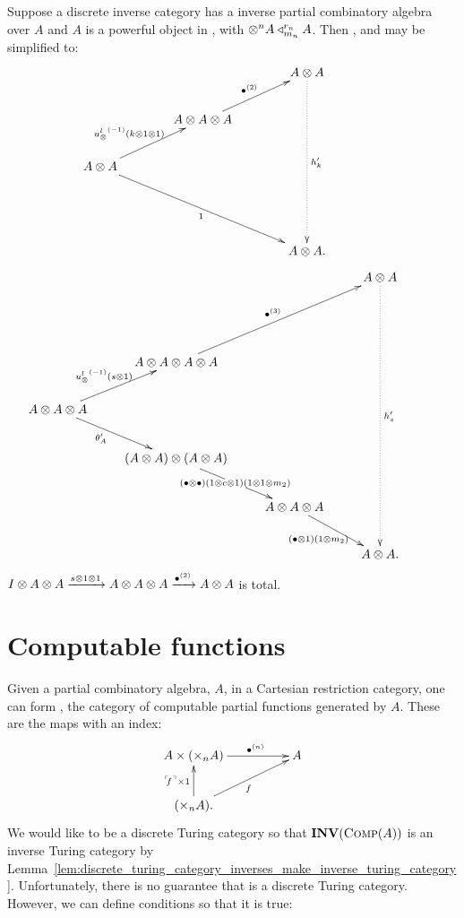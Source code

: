 \begin{lemma}\label{lem:powerful_inverse_partial_combinatory_algebra}
  Suppose a discrete inverse category \X has a inverse partial combinatory algebra over $A$ and $A$
  is  a powerful object in \X, with $\otimes^n A \triangleleft_{m_n}^{r_n} A$. Then ,
   and  may be simplified to:\\
    \[
      \xymatrix@C+15pt{
         && A\*A \ar@{.>}[dddd]^{h'_k}\\
        &A\* A\* A \ar[ur]^{\multibullet{2}} & & \\
        A\* A \ar[ur]^{\inv{\usl}(k\*1\*1)\ \,} \ar[ddrr]_{1} && &\\
         && & \\
        && A\*A. &
      }
    \]
    \[
      \xymatrix{
        &&& A\* A \ar@{.>}[dddddd]^{h'_s} \\
        & &  && \\
        &A\* A\* A\* A
          \ar[uurr]^{\multibullet{3}}\\
        A\* A\* A \ar[ur]^{\inv{\usl}(s\*1)} \ar[dr]_(.4){\theta_A'}\\
        &(A\* A) \* (A\* A) \ar[dr]|{(\bullet\*\bullet)(1\*c\*1)(1\*1\*m_2)} \\
        & &A\* A\* A\ar[dr]_{(\bullet\*1)(1\*m_2)}& &\\
        &&&A\*A. \\
      }
    \]
    $I\otimes A\otimes A \xrightarrow{s\otimes1\otimes1} A\otimes A\otimes A \xrightarrow{{\bullet}^{(2)}} A\otimes A$
   is total.
\end{lemma}

\section{Computable functions}
\label{sec:computable_functions}

Given a partial combinatory algebra, $A$, in a Cartesian restriction category, one can form \compa,
the category of computable partial functions generated by $A$. These are the maps with an index:
\[
  \xymatrix@C+25pt{
    A\times (\times_n A) \ar[r]^(.6){\multibullet{n}} & A \\
    (\times_n A). \ar[u]^{\name{f}\times 1} \ar[ur]_f
  }
\]
We would like \compa to be a discrete Turing category so that $\mathbf{INV}({\textsc{Comp}(A)})$ is an inverse Turing
category by
Lemma~\ref{lem:discrete_turing_category_inverses_make_inverse_turing_category}. Unfortunately, there
is no guarantee that \compa is a discrete Turing category.  However, we can define conditions
so that it is true:


